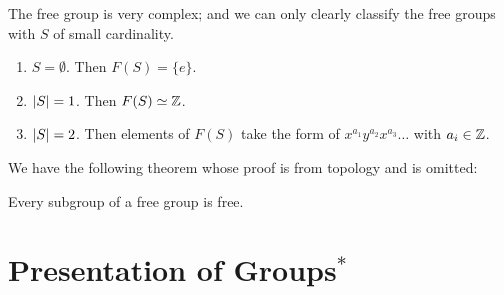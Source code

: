 \documentclass{article}
\begin{document}
\begin{example}
    The free group is very complex; and we can only clearly classify the free groups with $S$ of small cardinality.
    \begin{enumerate}[label=\arabic*)]
        \item $S = \emptyset$. Then $F(S) = \{e\}$.
        \item $\left|S\right| = 1$. Then $F(S) \simeq \mathbb{Z}$.
        \item $\left|S\right| = 2$. Then elements of $F(S)$ take the form of $x^{a_1}y^{a_2}x^{a_3} \dots$ with $a_i \in \mathbb{Z}$.
    \end{enumerate}
\end{example}

\textstart
We have the following theorem whose proof is from topology and is omitted:

\begin{theorem}[Schreier]
    Every subgroup of a free group is free.
\end{theorem}

\section{Presentation of Groups$^{\ast}$}
\end{document}
